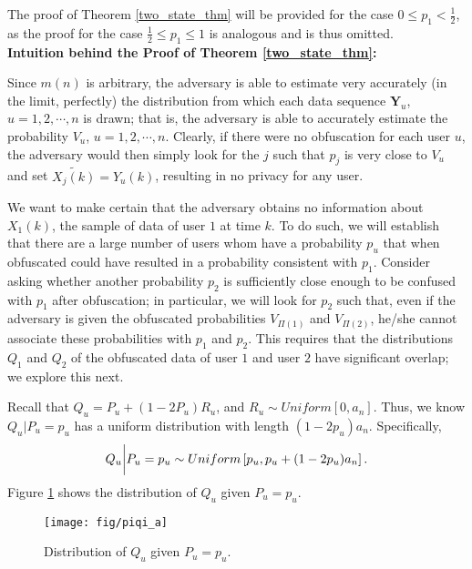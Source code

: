 The proof of Theorem \ref{two_state_thm} will be provided for the case $0\leq p_1<\frac{1}{2}$, as the proof for the case $\frac{1}{2}\leq p_1\leq1$ is analogous and is thus omitted.
\\

\noindent \textbf{Intuition behind the Proof of Theorem \ref{two_state_thm}:} 

Since $m(n)$ is arbitrary, the adversary is able to estimate very accurately (in the limit, perfectly) the distribution from which each data sequence $\textbf{Y}_u$, $u= 1, 2, \cdots, n$ is drawn; that is, the adversary is able to accurately estimate the probability $V_u$, $u= 1, 2, \cdots, n$. Clearly, if there were no obfuscation for each user $u$, the adversary would then simply look for the $j$ such that $p_j$ is very close to $V_u$ and set $\widetilde{X_j(k)}=Y_u(k)$, resulting in no privacy for any user.

We want to make certain that the adversary obtains no information about $X_1(k)$, the sample of data of user $1$ at time $k$. To do such, we will establish that there are a large number of users whom have a probability $p_u$ that when obfuscated could have resulted in a probability consistent with $p_1$. Consider asking whether another probability $p_2$ is sufficiently close enough to be confused with $p_1$ after obfuscation; in particular, we will look for $p_2$ such that, even if the adversary is given the obfuscated probabilities $V_{\Pi(1)}$ and $V_{\Pi(2)}$, he/she cannot associate these probabilities with $p_1$ and $p_2$. This requires that the distributions $Q_{1}$ and $Q_{2}$ of the obfuscated data of user $1$ and user $2$ have significant overlap; we explore this next.

Recall that $Q_u=P_u+ (1-2P_u)R_u$, and $R_u\sim Uniform [0, a_n]$. Thus, we know $Q_u {|} P_u=p_u$ has a uniform distribution with length $(1-2p_u)a_n$. Specifically,
\[Q_u\bigg{|}P_u=p_u \sim Uniform \left[p_u,p_u+(1-2p_u)a_n\right].\]
Figure \ref{fig:piqi_a} shows the distribution of $Q_u$ given $P_u=p_u$.

\begin{figure}[h]
	\centering
	\texttt{[image: fig/piqi\_a]}
	\caption{Distribution of $Q_u$ given $P_u=p_u$.}
	\label{fig:piqi_a}
\end{figure}

